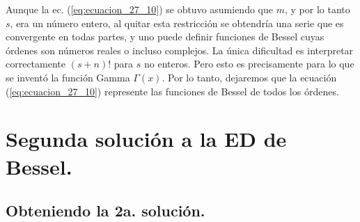 \documentclass[12pt]{article}
\numberwithin{equation}{section}
\begin{document}
Aunque la ec. (\ref{eq:ecuacion_27_10}) se obtuvo asumiendo que $m$, y por lo tanto $s$, era un número entero, al quitar esta restricción se obtendría una serie que es convergente en todas partes, y uno puede definir funciones de Bessel cuyas órdenes son números reales o incluso complejos. La única dificultad es interpretar correctamente $(s + n)!$ para $s$ no enteros. Pero esto es precisamente para lo que se inventó la función Gamma $\Gamma (x)$.  Por lo tanto, dejaremos que la ecuación (\ref{eq:ecuacion_27_10}) represente las funciones de Bessel de todos los órdenes.

\section{Segunda solución a la ED de Bessel.}
\subsection{Obteniendo la 2a. solución.}
\end{document}
